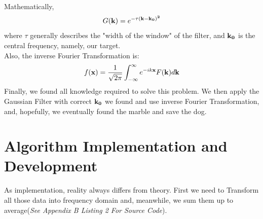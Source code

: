 \documentclass[12pt]{article}
\begin{document}
Mathematically,
 \[G({\bf k}) = e^{-\tau(\bf k - k_0)^2}\]
 where $\tau$ generally describes the "width of the window" of the filter, and $\bf k_0$ is the central frequency, namely, our target.\\
Also, the inverse Fourier Transformation is:
\[ f({\bf x}) = \frac{1}{\sqrt{2\pi}} \int_{-\infty}^{\infty} e^{-ik{\bf x}}F({\bf k}) d{\bf k} \]
Finally, we found all knowledge required to solve this problem. We then apply the Gaussian Filter with correct $\bf k_0$ we found and use inverse Fourier Transformation, and, hopefully, we eventually found the marble and save the dog.
 
\section{Algorithm Implementation and Development}
As implementation, reality always differs from theory. First we need to Transform all those data into frequency domain and, meanwhile, we sum them up to average(\textit{See Appendix B Listing 2 For Source Code}).\\
	
\end{document}
